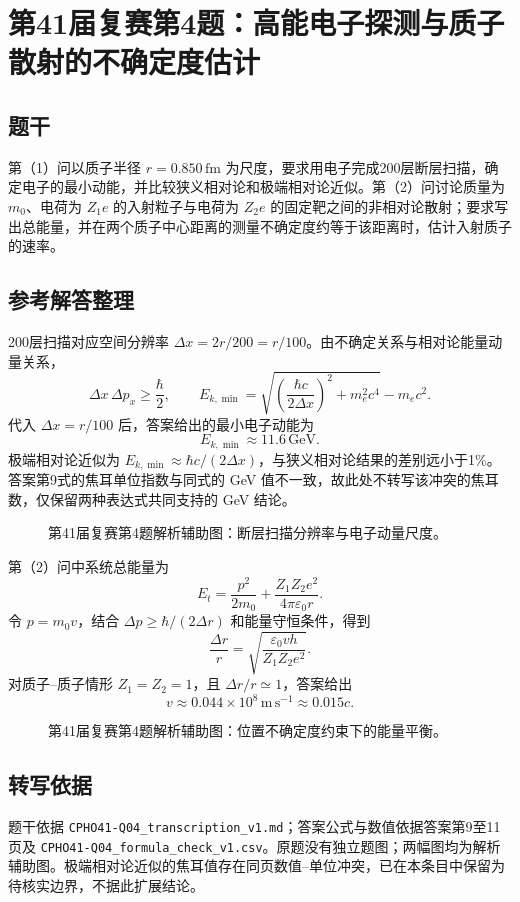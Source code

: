 \section{第41届复赛第4题：高能电子探测与质子散射的不确定度估计}
\subsection{题干}
第（1）问以质子半径 $r=0.850\,\mathrm{fm}$ 为尺度，要求用电子完成200层断层扫描，确定电子的最小动能，并比较狭义相对论和极端相对论近似。第（2）问讨论质量为 $m_0$、电荷为 $Z_1e$ 的入射粒子与电荷为 $Z_2e$ 的固定靶之间的非相对论散射；要求写出总能量，并在两个质子中心距离的测量不确定度约等于该距离时，估计入射质子的速率。
\subsection{参考解答整理}
200层扫描对应空间分辨率 $\Delta x=2r/200=r/100$。由不确定关系与相对论能量动量关系，
\[\Delta x\,\Delta p_x\geq\frac{\hbar}{2},\qquad E_{k,\min}=\sqrt{\left(\frac{\hbar c}{2\Delta x}\right)^2+m_e^2c^4}-m_ec^2.\]
代入 $\Delta x=r/100$ 后，答案给出的最小电子动能为 \[\boxed{E_{k,\min}\approx11.6\,\mathrm{GeV}}.\]
极端相对论近似为 $E_{k,\min}\approx\hbar c/(2\Delta x)$，与狭义相对论结果的差别远小于1\%。答案第9式的焦耳单位指数与同式的 GeV 值不一致，故此处不转写该冲突的焦耳数，仅保留两种表达式共同支持的 GeV 结论。
\begin{figure}[htbp]\centering\caption{第41届复赛第4题解析辅助图：断层扫描分辨率与电子动量尺度。}\end{figure}

第（2）问中系统总能量为
\[E_t=\frac{p^2}{2m_0}+\frac{Z_1Z_2e^2}{4\pi\varepsilon_0r}.\]
令 $p=m_0v$，结合 $\Delta p\geq\hbar/(2\Delta r)$ 和能量守恒条件，得到
\[\frac{\Delta r}{r}=\sqrt{\frac{\varepsilon_0vh}{Z_1Z_2e^2}}.\]
对质子--质子情形 $Z_1=Z_2=1$，且 $\Delta r/r\simeq1$，答案给出
\[\boxed{v\approx0.044\times10^8\,\mathrm{m\,s^{-1}}\approx0.015c}.\]
\begin{figure}[htbp]\centering\caption{第41届复赛第4题解析辅助图：位置不确定度约束下的能量平衡。}\end{figure}
\subsection{转写依据}
题干依据 \texttt{CPHO41-Q04\_transcription\_v1.md}；答案公式与数值依据答案第9至11页及 \texttt{CPHO41-Q04\_formula\_check\_v1.csv}。原题没有独立题图；两幅图均为解析辅助图。极端相对论近似的焦耳值存在同页数值--单位冲突，已在本条目中保留为待核实边界，不据此扩展结论。
